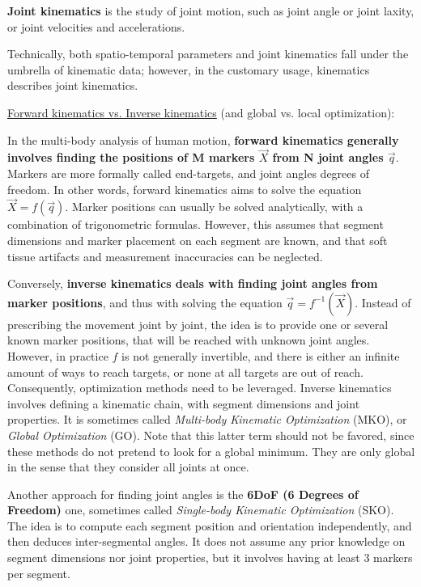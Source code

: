 \textbf{Joint kinematics} is the study of joint motion, such as joint angle or joint laxity, or joint velocities and accelerations.

Technically, both spatio-temporal parameters and joint kinematics fall under the umbrella of kinematic data; however, in the customary usage, kinematics describes joint kinematics.


\vspace*{0.5cm}
\noindent\underline{Forward kinematics vs. Inverse kinematics} (and global vs. local optimization):

In the multi-body analysis of human motion, \textbf{forward kinematics generally involves finding the positions of M markers $\overrightarrow{X}$ from N joint angles $\overrightarrow{q}$}. Markers are more formally called end-targets, and joint angles degrees of freedom. In other words, forward kinematics aims to solve the equation $\overrightarrow{X}=f(\overrightarrow{q})$. Marker positions can usually be solved analytically, with a combination of trigonometric formulas. However, this assumes that segment dimensions and marker placement on each segment are known, and that soft tissue artifacts and measurement inaccuracies can be neglected.

Conversely, \textbf{inverse kinematics deals with finding joint angles from marker positions}, and thus with solving the equation $\overrightarrow{q}=f^{-1}(\overrightarrow{X})$. Instead of prescribing the movement joint by joint, the idea is to provide one or several known marker positions, that will be reached with unknown joint angles. However, in practice $f$ is not generally invertible, and there is either an infinite amount of ways to reach targets, or none at all targets are out of reach. Consequently, optimization methods need to be leveraged. Inverse kinematics involves defining a kinematic chain, with segment dimensions and joint properties. It is sometimes called \emph{Multi-body Kinematic Optimization} (MKO), or \emph{Global Optimization} (GO). Note that this latter term should not be favored, since these methods do not pretend to look for a global minimum. They are only global in the sense that they consider all joints at once.

Another approach for finding joint angles is the \textbf{6DoF (6 Degrees of Freedom)} one, sometimes called \emph{Single-body Kinematic Optimization} (SKO). The idea is to compute each segment position and orientation independently, and then deduces inter-segmental angles. It does not assume any prior knowledge on segment dimensions nor joint properties, but it involves having at least 3 markers per segment.

